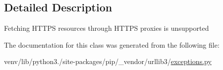 \subsection{Detailed Description}
\begin{DoxyVerb}Fetching HTTPS resources through HTTPS proxies is unsupported\end{DoxyVerb}
 

The documentation for this class was generated from the following file\+:\begin{DoxyCompactItemize}
\item 
venv/lib/python3./site-\/packages/pip/\+\_\+vendor/urllib3/\hyperlink{pip_2__vendor_2urllib3_2exceptions_8py}{exceptions.\+py}\end{DoxyCompactItemize}
